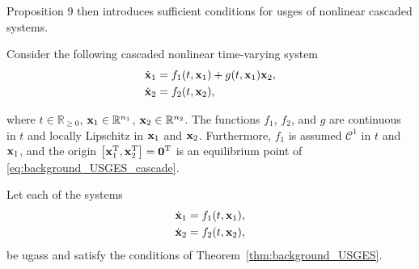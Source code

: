 Proposition 9 then introduces sufficient conditions for \acrfull{usges} of nonlinear cascaded systems.
\begin{prop}
    \label{prop:background_cascade}
    Consider the following cascaded nonlinear time-varying system
    \begin{subequations}
        \begin{align}
            \dot{\mathbf{x}}_1 &= f_1(t, \mathbf{x}_1) + g(t, \mathbf{x}_1)\mathbf{x}_2, \\
            \dot{\mathbf{x}}_2 &= f_2(t, \mathbf{x}_2),
        \end{align}
        \label{eq:background_USGES_cascade}
    \end{subequations}

    \noindent where $t \in \mathbb{R}_{\geq 0}$, $\mathbf{x}_1 \in \mathbb{R}^{n_1}$, $\mathbf{x}_2 \in \mathbb{R}^{n_2}$.
    The functions $f_1$, $f_2$, and $g$ are continuous in $t$ and locally Lipschitz in $\mathbf{x}_1$ and $\mathbf{x}_2$.
    Furthermore, $f_1$ is assumed $\mathcal{C}^1$ in $t$ and $\mathbf{x}_1$, and the origin $\left[\mathbf{x}_1^{\mathrm{T}}, \mathbf{x}_2^{\mathrm{T}}\right] = \mathbf{0}^{\mathrm{T}}$ is an equilibrium point of \eqref{eq:background_USGES_cascade}.

    Let each of the systems
    \begin{align}
        \dot{\mathbf{x}}_1 &= f_1(t, \mathbf{x}_1), \label{eq:background_nominal} \\
        \dot{\mathbf{x}}_2 &= f_2(t, \mathbf{x}_2), 
    \end{align}
    be \glspl{ugas} and satisfy the conditions of Theorem~\ref{thm:background_USGES}.


\end{prop}
